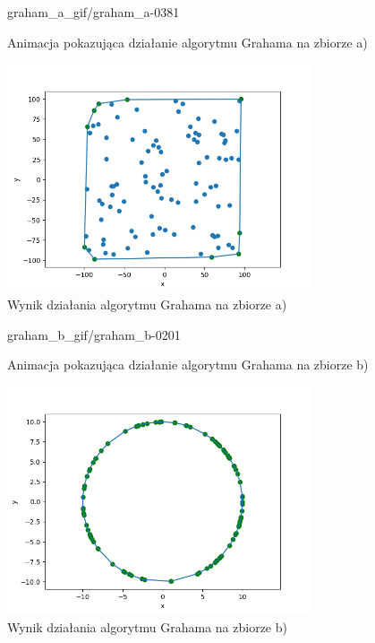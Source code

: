 \documentclass[a4paper]{article}
\begin{document}
\begin{figure}[H]
    {graham_a_gif/graham_a-}{0}{381}
    \centering
    \caption{Animacja pokazująca działanie algorytmu Grahama na zbiorze a)}
    \label{fig:anim_graham_a}
\end{figure}

\begin{figure}[H]
    \centering
    \includegraphics[width=0.8\textwidth]{graham/graham_a_png.png}
    \caption{Wynik działania algorytmu Grahama na zbiorze a)}
    \label{fig:graham_a}
\end{figure}

\begin{figure}[H]
    {graham_b_gif/graham_b-}{0}{201}
    \centering
    \caption{Animacja pokazująca działanie algorytmu Grahama na zbiorze b)}
    \label{fig:anim_graham_b}
\end{figure}

\begin{figure}[H]
    \centering
    \includegraphics[width=0.8\textwidth]{graham/graham_b_png.png}
    \caption{Wynik działania algorytmu Grahama na zbiorze b)}
    \label{fig:graham_b}
\end{figure}
\end{document}
